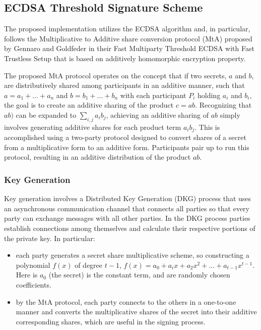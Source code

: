 \documentclass{article}
\begin{document}
\subsection{ECDSA Threshold Signature Scheme}
The proposed implementation utilizes the ECDSA algorithm and, in particular, follows the Multiplicative to Additive share conversion protocol (MtA) proposed by Gennaro and Goldfeder in their Fast Multiparty Threshold ECDSA with Fast Trustless Setup that is based on additively homomorphic encryption property.

The proposed MtA protocol operates on the concept that if two secrets, \(a\) and \(b\), are distributively shared among participants in an additive manner, such that \(a = a_1+...+a_n\) and \(b=b_1+...+b_n\) with each participant \(P_i\) holding \(a_i\) and \(b_i\), the goal is to create an additive sharing of the product \(c=ab\). Recognizing that \(ab)\) can be expanded to \(\sum_{i,j}a_ib_j\), achieving an additive sharing of \(ab\) simply involves generating additive shares for each product term \(a_ib_j\). This is accomplished using a two-party protocol designed to convert shares of a secret from a multiplicative form to an additive form. Participants pair up to run this protocol, resulting in an additive distribution of the product \(ab\).

\subsubsection{Key Generation}
Key generation involves a Distributed Key Generation (DKG) process that uses an asynchronous communication channel that connects all parties so that every party can exchange messages with all other parties.  In the DKG process parties establish connections among themselves and calculate their respective portions of the private key. In particular:

\begin{itemize}
    \item each party generates a secret share multiplicative scheme, so constructing a polynomial \(f(x)\) of degree \(t-1\), \(f(x)=a_0+a_ix+a_2x^2+...+a_{t-1}x^{t-1}\). Here is \(a_0\) (the secret) is the constant term, and are randomly chosen coefficients.
    \item by the MtA protocol, each party connects to the others in a one-to-one manner and converts the multiplicative shares of the secret into their additive corresponding shares, which are useful in the signing process.
\end{itemize}
\end{document}

